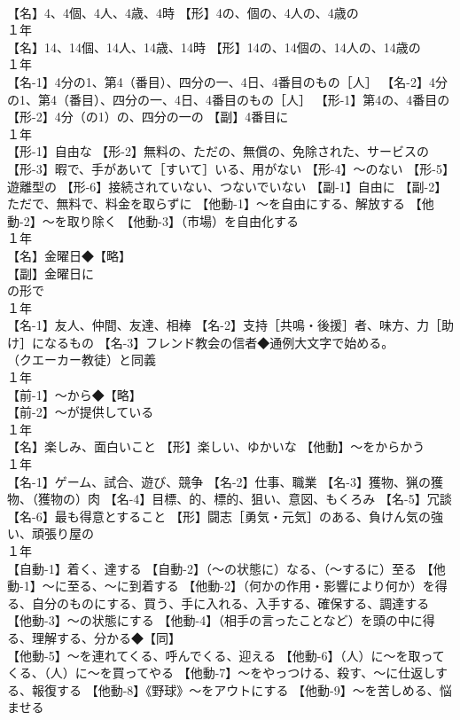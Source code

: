 \documentclass[8pt]{extreport}
\begin{document}
\begin{CJK}{UTF8}{min}
\\	【名】4、4個、4人、4歳、4時 【形】4の、個の、4人の、4歳の
\\	１年	
\\	【名】14、14個、14人、14歳、14時 【形】14の、14個の、14人の、14歳の
\\	１年	
\\	【名-1】4分の1、第4（番目）、四分の一、4日、4番目のもの［人］ 【名-2】4分の1、第4（番目）、四分の一、4日、4番目のもの［人］ 【形-1】第4の、4番目の 【形-2】4分（の1）の、四分の一の 【副】4番目に
\\	１年	
\\	【形-1】自由な 【形-2】無料の、ただの、無償の、免除された、サービスの 【形-3】暇で、手があいて［すいて］いる、用がない 【形-4】～のない 【形-5】遊離型の 【形-6】接続されていない、つないでいない 【副-1】自由に 【副-2】ただで、無料で、料金を取らずに 【他動-1】～を自由にする、解放する 【他動-2】～を取り除く 【他動-3】（市場）を自由化する
\\	１年	
\\	【名】金曜日◆【略】
\\	【副】金曜日に
\\	の形で
\\	１年	
\\	【名-1】友人、仲間、友達、相棒 【名-2】支持［共鳴・後援］者、味方、力［助け］になるもの 【名-3】フレンド教会の信者◆通例大文字で始める。
\\	（クエーカー教徒）と同義
\\	１年	
\\	【前-1】～から◆【略】
\\	【前-2】～が提供している
\\	１年	
\\	【名】楽しみ、面白いこと 【形】楽しい、ゆかいな 【他動】～をからかう
\\	１年	
\\	【名-1】ゲーム、試合、遊び、競争 【名-2】仕事、職業 【名-3】獲物、猟の獲物、（獲物の）肉 【名-4】目標、的、標的、狙い、意図、もくろみ 【名-5】冗談 【名-6】最も得意とすること 【形】闘志［勇気・元気］のある、負けん気の強い、頑張り屋の
\\	１年	
\\	【自動-1】着く、達する 【自動-2】（～の状態に）なる、（～するに）至る 【他動-1】～に至る、～に到着する 【他動-2】（何かの作用・影響により何か）を得る、自分のものにする、買う、手に入れる、入手する、確保する、調達する 【他動-3】～の状態にする 【他動-4】（相手の言ったことなど）を頭の中に得る、理解する、分かる◆【同】
\\	【他動-5】～を連れてくる、呼んでくる、迎える 【他動-6】（人）に～を取ってくる、（人）に～を買ってやる 【他動-7】～をやっつける、殺す、～に仕返しする、報復する 【他動-8】《野球》～をアウトにする 【他動-9】～を苦しめる、悩ませる

\end{CJK}
\end{document}
